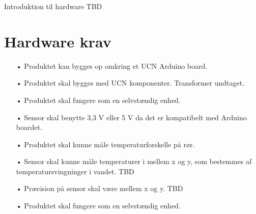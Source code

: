 Introduktion til hardware TBD
\section{Hardware krav}
\begin{enumerate}
	\item[•]Produktet kan bygges op omkring et UCN Arduino board. 
	\item[•]Produktet skal bygges med UCN komponenter. Transformer undtaget.
	\item[•]Produktet skal fungere som en selvstændig enhed.
	\item[•]Sensor skal benytte 3,3 V eller 5 V da det er kompatibelt med Arduino boardet.
	\item[•]Produktet skal kunne måle temperaturforskelle på rør.
	\item[•]Sensor skal kunne måle temperaturer i mellem x og y, som bestemmes af temperatursvingninger i vandet. TBD
	\item[•]Præcision på sensor skal være mellem x og y. TBD
	\item[•]Produktet skal fungere som en selvstændig enhed.
\end{enumerate}	
